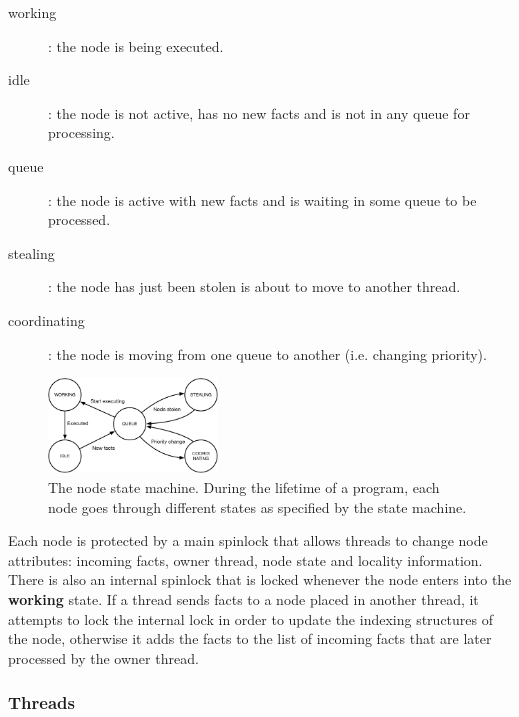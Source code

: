 \begin{description}
   \item[working]: the node is being executed.
   \item[idle]: the node is not active, has no new facts and is not in any
   queue for processing.
   \item[queue]: the node is active with new facts and is waiting in some queue
   to be processed.
   \item[stealing]: the node has just been stolen is about to move to another
   thread.
   \item[coordinating]: the node is moving from one queue to another (i.e.
         changing priority).
\end{description}

\begin{figure}[h!]
   \centering
   \includegraphics[width=0.4\textwidth]{node_states.pdf}
   \caption{The node state machine. During the lifetime of a program, each node
   goes through different states as specified by the state machine.}
   \label{fig:node_states}
\end{figure}

Each node is protected by a main spinlock that allows threads to change node
attributes: incoming facts, owner thread, node state and locality information.
There is also an internal spinlock that is locked whenever the node enters into
the \textbf{working} state. If a thread sends facts to a node placed in
another thread, it attempts to lock the internal lock in order to update the
indexing structures of the node, otherwise it adds the facts to the list of
incoming facts that are later processed by the owner thread.

\subsubsection{Threads}

